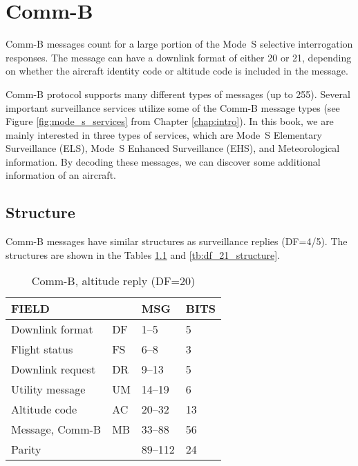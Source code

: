 \chapter{Comm-B} \label{chap:comm-b}

Comm-B messages count for a large portion of the Mode~S selective interrogation responses. The message can have a downlink format of either 20 or 21, depending on whether the aircraft identity code or altitude code is included in the message.

Comm-B protocol supports many different types of messages (up to 255). Several important surveillance services utilize some of the Comm-B message types (see Figure \ref{fig:mode_s_services} from Chapter \ref{chap:intro}). In this book, we are mainly interested in three types of services, which are Mode~S Elementary Surveillance (ELS), Mode~S Enhanced Surveillance (EHS), and Meteorological information. By decoding these messages, we can discover some additional information of an aircraft.


\section{Structure}

Comm-B messages have similar structures as surveillance replies (DF=4/5). The structures are shown in the Tables \ref{tb:df_20_structure} and \ref{tb:df_21_structure}.

\begin{table}[!ht]
  \centering
  \caption{Comm-B, altitude reply (DF=20)}
  \label{tb:df_20_structure}
  \begin{tabular}[t]{|l|l|l|l|}
  \hline
  \textbf{FIELD} & \textbf{} & \textbf{MSG} & \textbf{BITS} \\ \hline
  Downlink format         & DF & 1--5    & 5   \\ \hline
  Flight status           & FS & 6--8    & 3   \\ \hline
  Downlink request        & DR & 9--13   & 5   \\ \hline
  Utility message         & UM & 14--19  & 6   \\ \hline
  Altitude code           & AC & 20--32  & 13  \\ \hline
  Message, Comm-B         & MB & 33--88  & 56  \\ \hline
  Parity  &  & 89--112  & 24  \\ \hline
  \end{tabular}
\end{table}


